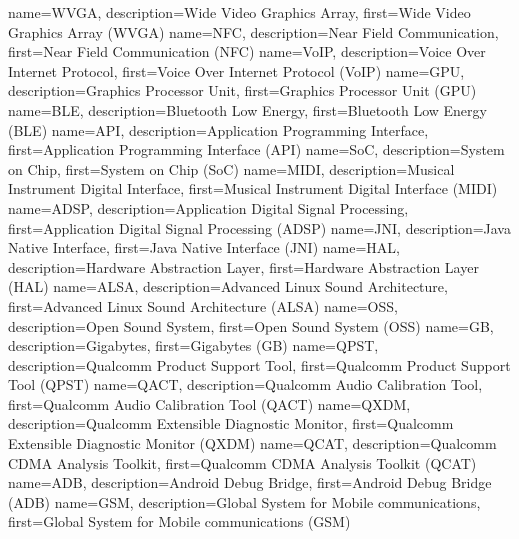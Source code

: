 {
  name={WVGA},
  description={Wide Video Graphics Array},
  first={Wide Video Graphics Array (WVGA)}
}
{
	name={NFC},
	description={Near Field Communication},
	first={Near Field Communication (NFC)}
}
{
	name={VoIP},
	description={Voice Over Internet Protocol},
	first={Voice Over Internet Protocol (VoIP)}
}
{
	name={GPU},
	description={Graphics Processor Unit},
	first={Graphics Processor Unit (GPU)}
}
{
	name={BLE},
	description={Bluetooth Low Energy},
	first={Bluetooth Low Energy (BLE)}
}
{
	name={API},
	description={Application Programming Interface},
	first={Application Programming Interface (API)}
}
{
	name={SoC},
	description={System on Chip},
	first={System on Chip (SoC)}
}
{
	name={MIDI},
	description={Musical Instrument Digital Interface},
	first={Musical Instrument Digital Interface (MIDI)}
}
{
	name={ADSP},
	description={Application Digital Signal Processing},
	first={Application Digital Signal Processing (ADSP)}
}
{
	name={JNI},
	description={Java Native Interface},
	first={Java Native Interface (JNI)}
}
{
	name={HAL},
	description={Hardware Abstraction Layer},
	first={Hardware Abstraction Layer (HAL)}
}
{
	name={ALSA},
	description={Advanced Linux Sound Architecture},
	first={Advanced Linux Sound Architecture (ALSA)}
}
{
	name={OSS},
	description={Open Sound System},
	first={Open Sound System (OSS)}
}
{
	name={GB},
	description={Gigabytes},
	first={Gigabytes (GB)}
}
{
	name={QPST},
	description={Qualcomm Product Support Tool},
	first={Qualcomm Product Support Tool (QPST)}
}
{
	name={QACT},
	description={Qualcomm Audio Calibration Tool},
	first={Qualcomm Audio Calibration Tool (QACT)}
}
{
	name={QXDM},
	description={Qualcomm Extensible Diagnostic Monitor},
	first={Qualcomm Extensible Diagnostic Monitor (QXDM)}
}
{
	name={QCAT},
	description={Qualcomm CDMA Analysis Toolkit},
	first={Qualcomm CDMA Analysis Toolkit (QCAT)}
}
{
	name={ADB},
	description={Android Debug Bridge},
	first={Android Debug Bridge (ADB)}
}
{	
	name={GSM},
	description={Global System for Mobile communications},
	first={Global System for Mobile communications (GSM)}
}
